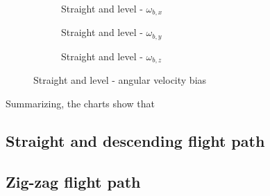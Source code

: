 \begin{figure}[!ht]
    \centering
    \begin{subfigure}{0.3\textwidth}
        
        \caption{Straight and level - $\omega_{b,x}$}
    \end{subfigure}
    \hfill
    \begin{subfigure}{0.3\textwidth}
        
        \caption{Straight and level - $\omega_{b,y}$}
    \end{subfigure}
    \hfill
    \begin{subfigure}{0.3\textwidth}
        
        \caption{Straight and level - $\omega_{b,z}$}
    \end{subfigure}
    \caption{Straight and level - angular velocity bias}
    \label{fig:straight-level-wbias}
\end{figure}

Summarizing, the charts show that


\subsection{Straight and descending flight path}

\subsection{Zig-zag flight path}